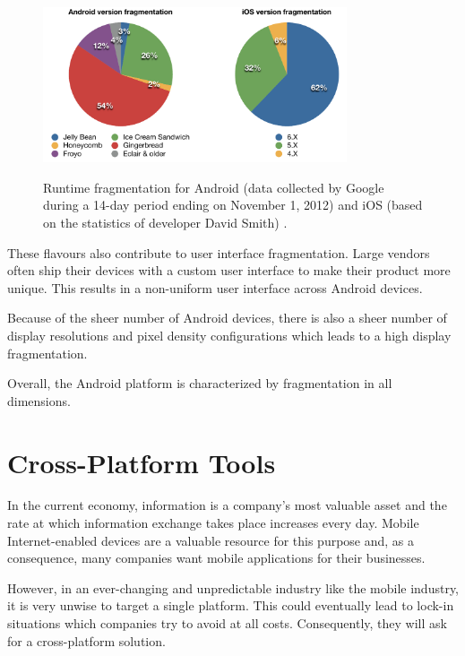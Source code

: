 \begin{figure}[h!]
    \begin{center}
        \label{fig:runtime_fragmentation}
        \includegraphics[width=0.8\textwidth]{figs/os_distribution.pdf}
        \caption{
            Runtime fragmentation for Android (data collected by Google during a 14-day period ending on November 1, 2012) \citep{android_distribution} and iOS (based on the statistics of developer David Smith) \citep{ios_distribution}.
        }
    \end{center}
\end{figure}

These flavours also contribute to user interface fragmentation. Large vendors often ship their devices with a custom user interface to make their product more unique. This results in a non-uniform user interface across Android devices.

Because of the sheer number of Android devices, there is also a sheer number of display resolutions and pixel density configurations which leads to a high display fragmentation. 

Overall, the Android platform is characterized by fragmentation in all dimensions.

\section{Cross-Platform Tools}

In the current economy, information is a company's most valuable asset and the rate at which information exchange takes place increases every day. Mobile Internet-enabled devices are a valuable resource for this purpose and, as a consequence, many companies want mobile applications for their businesses.

However, in an ever-changing and unpredictable industry like the mobile industry, it is very unwise to target a single platform. This could eventually lead to lock-in situations which companies try to avoid at all costs. Consequently, they will ask for a cross-platform solution. 

